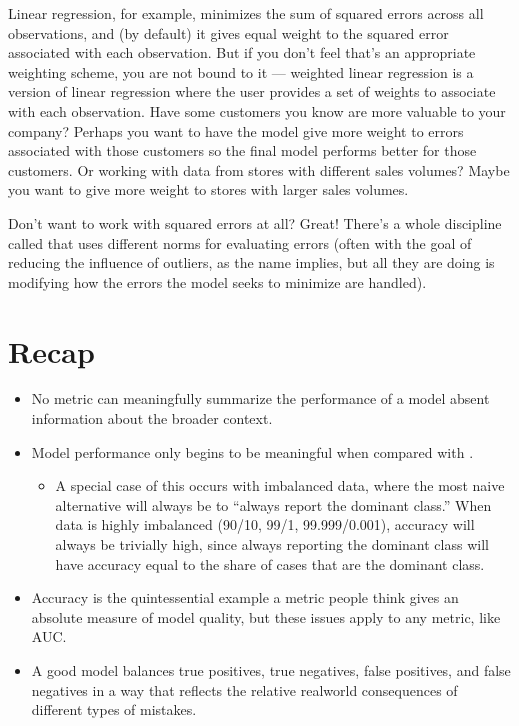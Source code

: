 \documentclass[letterpaper,10pt,english]{jupyterBook}
\begin{document}
\sphinxAtStartPar
Linear regression, for example, minimizes the sum of squared errors across all observations, and (by default) it gives equal weight to the squared error associated with each observation. But if you don’t feel that’s an appropriate weighting scheme, you are not bound to it — weighted linear regression is a version of linear regression where the user provides a set of weights to associate with each observation. Have some customers you know are more valuable to your company? Perhaps you want to have the model give more weight to errors associated with those customers so the final model performs better for those customers. Or working with data from stores with different sales volumes? Maybe you want to give more weight to stores with larger sales volumes.

\sphinxAtStartPar
Don’t want to work with squared errors at all? Great! There’s a whole discipline called  that uses different norms for evaluating errors (often with the goal of reducing the influence of outliers, as the name implies, but all they are doing is modifying how the errors the model seeks to minimize are handled).


\section{Recap}
\label{\detokenize{30_questions/24_passive_internal_errors:recap}}\begin{itemize}
\item {} 
\sphinxAtStartPar
No metric can meaningfully summarize the performance of a model absent information about the broader context.

\item {} 
\sphinxAtStartPar
Model performance only begins to be meaningful when compared with .
\begin{itemize}
\item {} 
\sphinxAtStartPar
A special case of this occurs with imbalanced data, where the most naive alternative will always be to “always report the dominant class.” When data is highly imbalanced (90/10, 99/1, 99.999/0.001), accuracy will always be trivially high, since always reporting the dominant class will have accuracy equal to the share of cases that are the dominant class.

\end{itemize}

\item {} 
\sphinxAtStartPar
Accuracy is the quintessential example a metric people think gives an absolute measure of model quality, but these issues apply to any metric, like AUC.

\item {} 
\sphinxAtStartPar
{} A good model balances true positives, true negatives, false positives, and false negatives in a way that reflects the relative real\sphinxhyphen{}world consequences of different types of mistakes.

\end{itemize}
\end{document}
